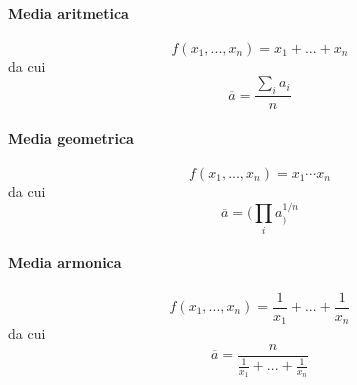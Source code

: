 \documentclass[10pt, oneside]{book}
\theoremstyle{plain}
\begin{document}
\paragraph{Media aritmetica}
\[f(x_1, ..., x_n) = x_1 + ... + x_n\]
da cui
\[\overline{a} = \frac{\sum_i a_i}{n}\]
\paragraph{Media geometrica}
\[f(x_1, ..., x_n) = x_1 \cdots x_n\]
da cui
\[\overline{a} = \big(\prod_i a_\big)^{1/n}\]
\paragraph{Media armonica}
\[f(x_1, ..., x_n) = \frac{1}{x_1} + ... + \frac{1}{x_n}\]
da cui
\[\overline{a} = \frac{n}{\displaystyle \frac{1}{x_1} + ... + \frac{1}{x_n}}\]
\end{document}
